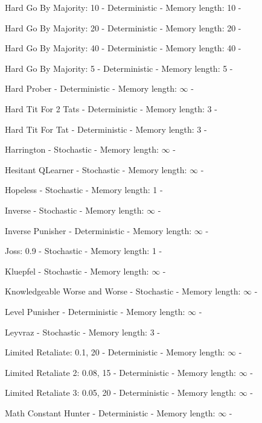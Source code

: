 \item Hard Go By Majority: 10 - Deterministic - Memory length: 10 - \cite{Knight2018}
\item Hard Go By Majority: 20 - Deterministic - Memory length: 20 - \cite{Knight2018}
\item Hard Go By Majority: 40 - Deterministic - Memory length: 40 - \cite{Knight2018}
\item Hard Go By Majority: 5 - Deterministic - Memory length: 5 - \cite{Knight2018}
\item Hard Prober - Deterministic - Memory length: \(\infty\) - \cite{Prison1998}
\item Hard Tit For 2 Tats - Deterministic - Memory length: 3 - \cite{Stewart2012}
\item Hard Tit For Tat - Deterministic - Memory length: 3 - \cite{PD2017}
\item Harrington - Stochastic - Memory length: \(\infty\) - \cite{Axelrod1980b}
\item Hesitant QLearner - Stochastic - Memory length: \(\infty\) - \cite{Knight2018}
\item Hopeless - Stochastic - Memory length: 1 - \cite{Berg2015}
\item Inverse - Stochastic - Memory length: \(\infty\) - \cite{Knight2018}
\item Inverse Punisher - Deterministic - Memory length: \(\infty\) - \cite{Knight2018}
\item Joss: 0.9 - Stochastic - Memory length: 1 - \cite{Stewart2012, Axelrod1980}
\item Kluepfel - Stochastic - Memory length: \(\infty\) - \cite{Axelrod1980b}
\item Knowledgeable Worse and Worse - Stochastic - Memory length: \(\infty\) - \cite{Knight2018}
\item Level Punisher - Deterministic - Memory length: \(\infty\) - \cite{Eckhart2015}
\item Leyvraz - Stochastic - Memory length: 3 - \cite{Axelrod1980b}
\item Limited Retaliate: 0.1, 20 - Deterministic - Memory length: \(\infty\) - \cite{Knight2018}
\item Limited Retaliate 2: 0.08, 15 - Deterministic - Memory length: \(\infty\) - \cite{Knight2018}
\item Limited Retaliate 3: 0.05, 20 - Deterministic - Memory length: \(\infty\) - \cite{Knight2018}
\item Math Constant Hunter - Deterministic - Memory length: \(\infty\) - \cite{Knight2018}
